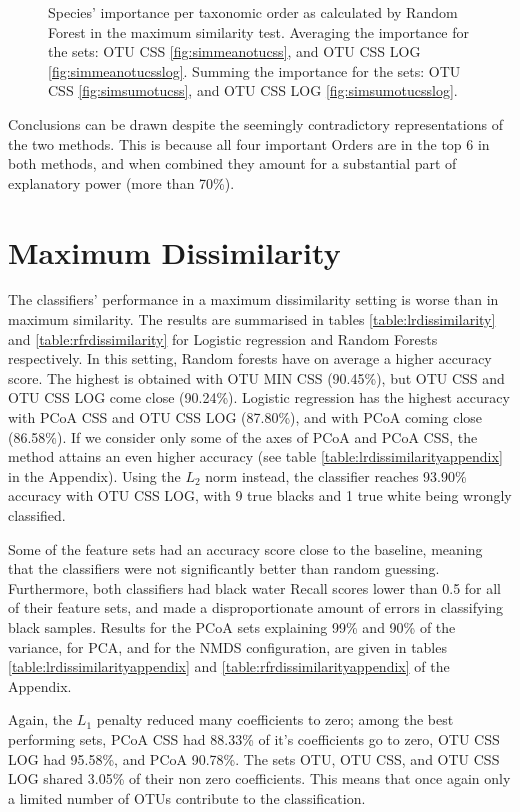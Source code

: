 \begin{figure}[!h]
		\caption{Species' importance per taxonomic order as calculated by Random Forest in the maximum similarity test. Averaging the importance for the sets: OTU CSS \ref{fig:simmeanotucss}, and OTU CSS LOG \ref{fig:simmeanotucsslog}. Summing the importance for the sets: OTU CSS \ref{fig:simsumotucss}, and OTU CSS LOG \ref{fig:simsumotucsslog}. }
	\label{fig:simpie}
\end{figure}

Conclusions can be drawn despite the seemingly contradictory representations of the two methods. This is because all four important Orders are in the top 6 in both methods, and when combined they amount for a substantial part of explanatory power (more than 70\%).    


\section{Maximum Dissimilarity}

The classifiers' performance in a maximum dissimilarity setting is worse than in maximum similarity. The results are summarised in tables \ref{table:lrdissimilarity} and \ref{table:rfrdissimilarity} for Logistic regression and Random Forests respectively. In this setting, Random forests have on average a higher accuracy score. The highest is obtained with OTU MIN CSS (90.45\%), but OTU CSS and OTU CSS LOG come close (90.24\%). Logistic regression has the highest accuracy with PCoA CSS and OTU CSS LOG (87.80\%), and with PCoA coming close (86.58\%). If we consider only some of the axes of PCoA and PCoA CSS, the method attains an even higher accuracy (see table \ref{table:lrdissimilarityappendix} in the Appendix). Using the $L_2$ norm instead, the classifier reaches 93.90\% accuracy with OTU CSS LOG, with 9 true blacks and 1 true white being wrongly classified.

Some of the feature sets had an accuracy score close to the baseline, meaning that the classifiers were not significantly better than random guessing. Furthermore, both classifiers had black water Recall scores lower than 0.5 for all of their feature sets, and made a disproportionate amount of errors in classifying black samples. 
Results for the PCoA sets explaining 99\% and 90\% of the variance, for PCA, and for the NMDS configuration, are given in tables \ref{table:lrdissimilarityappendix} and \ref{table:rfrdissimilarityappendix} of the Appendix.

Again, the $L_1$ penalty reduced many coefficients to zero; among the best performing sets,  PCoA CSS had 88.33\% of it's coefficients go to zero, OTU CSS LOG had 95.58\%, and PCoA 90.78\%. The sets OTU, OTU CSS, and OTU CSS LOG shared 3.05\% of their non zero coefficients. This means that once again only a limited number of OTUs contribute to the classification. 
 
